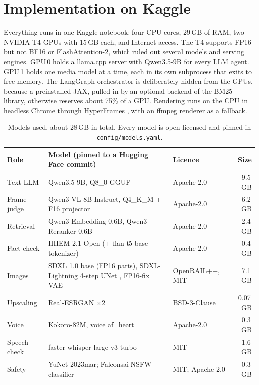 \documentclass[twoside,11pt]{article}
\begin{document}
\section{Implementation on Kaggle}
\label{sec:impl}

Everything runs in one Kaggle notebook: four CPU cores, 29\,GB of RAM, two NVIDIA T4 GPUs with 15\,GB each, and Internet access. The T4 supports FP16 but not BF16 or FlashAttention-2, which ruled out several models and serving engines. GPU\,0 holds a llama.cpp server \citep{llamacpp2026} with Qwen3.5-9B \citep{qwen2025qwen3,qwen35model} for every LLM agent. GPU\,1 holds one media model at a time, each in its own subprocess that exits to free memory. The LangGraph orchestrator is deliberately hidden from the GPUs, because a preinstalled JAX, pulled in by an optional backend of the BM25 library, otherwise reserves about 75\% of a GPU. Rendering runs on the CPU in headless Chrome through HyperFrames \citep{hyperframes2026}, with an ffmpeg renderer as a fallback.

\begin{table}[t]
\centering
\small
\begin{tabularx}{\textwidth}{@{}p{2.3cm}Lp{2.3cm}r@{}}
\toprule
Role & Model (pinned to a Hugging Face commit) & Licence & Size \\
\midrule
Text LLM & Qwen3.5-9B, Q8\_0 GGUF & Apache-2.0 & 9.5\,GB \\
Frame judge & Qwen3-VL-8B-Instruct, Q4\_K\_M + F16 projector \citep{qwen3vlmodel} & Apache-2.0 & 6.2\,GB \\
Retrieval & Qwen3-Embedding-0.6B, Qwen3-Reranker-0.6B & Apache-2.0 & 2.4\,GB \\
Fact check & HHEM-2.1-Open (+ flan-t5-base tokenizer) & Apache-2.0 & 0.4\,GB \\
Images & SDXL 1.0 base \citep{podell2024sdxl} (FP16 parts), SDXL-Lightning 4-step UNet \citep{lin2024lightning}, FP16-fix VAE & OpenRAIL++, MIT & 7.1\,GB \\
Upscaling & Real-ESRGAN $\times$2 \citep{wang2021realesrgan} & BSD-3-Clause & 0.07\,GB \\
Voice & Kokoro-82M, voice af\_heart \citep{kokoro2025} & Apache-2.0 & 0.3\,GB \\
Speech check & faster-whisper large-v3-turbo & MIT & 1.6\,GB \\
Safety & YuNet 2023mar; Falconsai NSFW classifier & MIT; Apache-2.0 & 0.3\,GB \\
\bottomrule
\end{tabularx}
\caption{Models used, about 28\,GB in total. Every model is open-licensed and pinned in \texttt{config/models.yaml}.}
\label{tab:models}
\end{table}
\end{document}

